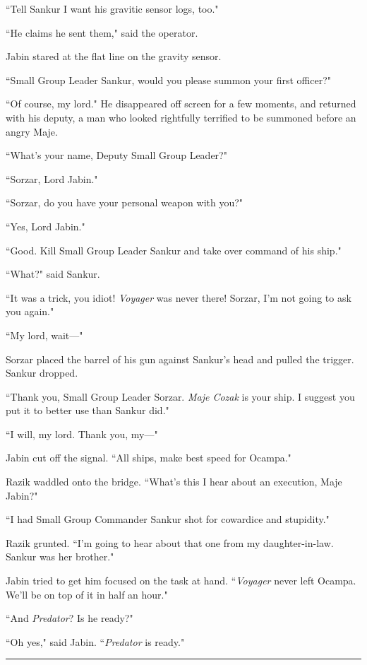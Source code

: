 \documentclass[twoside,letterpaper,12pt]{memoir}
\begin{document}
``Tell Sankur I want his gravitic sensor logs, too."

``He claims he sent them," said the operator.

Jabin stared at the flat line on the gravity sensor.

``Small Group Leader Sankur, would you please summon your first officer?"

``Of course, my lord." He disappeared off screen for a few moments, and returned with his deputy, a man who looked rightfully terrified to be summoned before an angry Maje.

``What's your name, Deputy Small Group Leader?"

``Sorzar, Lord Jabin."

``Sorzar, do you have your personal weapon with you?"

``Yes, Lord Jabin."

``Good. Kill Small Group Leader Sankur and take over command of his ship."

``What?" said Sankur.

``It was a trick, you idiot! \textit{Voyager} was never there! Sorzar, I'm not going to ask you again."

``My lord, wait---"

Sorzar placed the barrel of his gun against Sankur's head and pulled the trigger. Sankur dropped.

``Thank you, Small Group Leader Sorzar. \textit{Maje Cozak} is your ship. I suggest you put it to better use than Sankur did."

``I will, my lord. Thank you, my---"

Jabin cut off the signal. ``All ships, make best speed for Ocampa."

Razik waddled onto the bridge. ``What's this I hear about an execution, Maje Jabin?"

``I had Small Group Commander Sankur shot for cowardice and stupidity."

Razik grunted. ``I’m going to hear about that one from my daughter-in-law. Sankur was her brother."

Jabin tried to get him focused on the task at hand. ``\textit{Voyager} never left Ocampa. We'll be on top of it in half an hour."

``And \textit{Predator}? Is he ready?"

``Oh yes," said Jabin. ``\textit{Predator} is ready."

\begin{center}\rule{3cm}{0.4 pt}\end{center}
\end{document}
